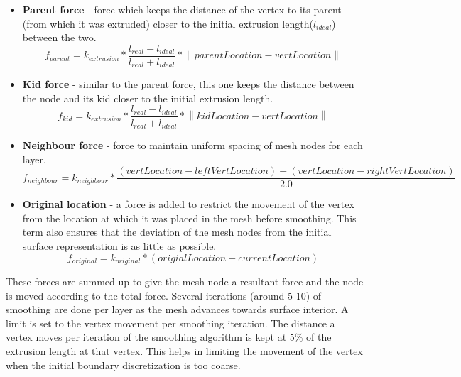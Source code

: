 \documentclass[conf]{new-aiaa}
\newcommand{\norm}[1]{\left\lVert#1\right\rVert}
\begin{document}
\begin{itemize}
\item \textbf{Parent force} - force which keeps the distance of the vertex to its parent (from which it was extruded) closer to the initial extrusion length($l_{ideal}$) between the two.
\begin{equation}
f_{parent} = k_{extrusion} * \frac{l_{real} - l_{ideal}}{l_{real} + l_{ideal}} * \norm{parentLocation - vertLocation}
\end{equation}
\item \textbf{Kid force} - similar to the parent force, this one keeps the distance between the node and its kid closer to the initial extrusion length.
\begin{equation}
f_{kid} = k_{extrusion} * \frac{l_{real} - l_{ideal}}{l_{real} + l_{ideal}} * \norm{kidLocation - vertLocation}
\end{equation}
\item \textbf{Neighbour force} - force to maintain uniform spacing of mesh nodes for each layer.
\begin{equation}
f_{neighbour} = k_{neighbour} * \frac{(vertLocation - leftVertLocation) + (vertLocation - rightVertLocation)}{ 2.0}
\end{equation}
\item \textbf{Original location} - a force is added to restrict the movement of the vertex from the location at which it was placed in the mesh before smoothing. This term also ensures that the deviation of the mesh nodes from the initial surface representation is as little as possible.
\begin{equation}
f_{original} = k_{original} * (origialLocation - currentLocation)
\end{equation}
\begin{equation}
\end{equation}
\end{itemize}

These forces are summed up to give the mesh node a resultant force and the node is moved according to the total force. Several iterations (around 5-10) of smoothing are done per layer as the mesh advances towards surface interior. A limit is set to the vertex movement per smoothing iteration. The distance a vertex moves per iteration of the smoothing algorithm is kept at $5\%$ of the extrusion length at that vertex. This helps in limiting the movement of the vertex when the initial boundary discretization is too coarse.
\end{document}
